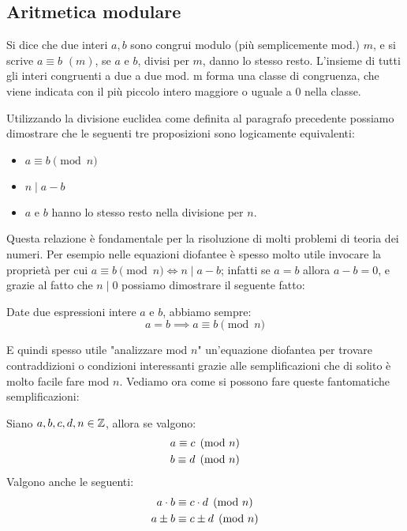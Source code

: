 \documentclass[11pt]{scrartcl}
\begin{document}
	\subsection{Aritmetica modulare}
	\begin{definition}
		Si dice che due interi $a,b$ sono congrui modulo (più semplicemente mod.) $m$, e si scrive $a \equiv b \,\, (m)$, se $a$ e $b$, divisi per $m$, danno lo stesso resto.
		L'insieme di tutti gli interi congruenti a due a due mod. m forma una classe di congruenza, che viene indicata con il più piccolo intero maggiore o uguale a 0 nella classe.
	\end{definition}
	\begin{remark}
		Utilizzando la divisione euclidea come definita al paragrafo precedente possiamo dimostrare che le seguenti tre proposizioni sono logicamente equivalenti:
		\begin{itemize}
			\item $a \equiv b \pmod{n}$
			\item $n \mid a-b$
			\item $a$ e $b$ hanno lo stesso resto nella divisione per $n$.
		\end{itemize}
	\end{remark}
	Questa relazione è fondamentale per la risoluzione di molti problemi di teoria dei numeri. Per esempio nelle equazioni diofantee è spesso molto utile invocare la proprietà per cui $a \equiv b \pmod{n} \iff n \mid a-b$; infatti se $a=b$ allora $a-b=0$, e grazie al fatto che $n\mid0$ possiamo dimostrare il seguente fatto:
	\begin{fact}
		Date due espressioni intere $a$ e $b$, abbiamo sempre:
		$$a=b \implies a \equiv b \pmod{n}$$
	\end{fact}
	E quindi spesso utile "analizzare mod $n$" un'equazione diofantea per trovare contraddizioni o condizioni interessanti grazie alle semplificazioni che di solito è molto facile fare mod $n$.
	Vediamo ora come si possono fare queste fantomatiche semplificazioni:
	\begin{lemma}
		\label{equiv:cong}
		Siano $a,b,c,d,n \in \mathbb Z$, allora se valgono:
		\begin{gather}
			\notag a \equiv c \pmod{n} \\
			\notag b \equiv d \pmod{n}
		\end{gather}
		Valgono anche le seguenti:
		\begin{gather}
			\notag a\cdot b \equiv c \cdot d \pmod{n} \\
			\notag a \pm b \equiv c \pm d \pmod{n}
		\end{gather}
	\end{lemma}
\end{document}
